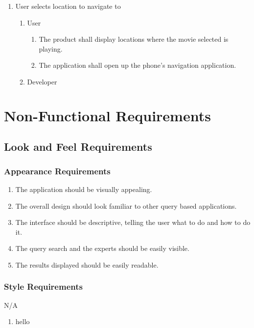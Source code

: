 \documentclass[]{article}
\begin{document}
\begin{enumerate}[{BE}1.]
	\item User selects location to navigate to
	\begin{enumerate}[{VP3}.1]
		\item User
			\begin{enumerate}
				\item The product shall display locations where the movie selected is playing.
				\item The application shall open up the phone’s navigation application.
			\end{enumerate}
		\item Developer
	\end{enumerate}
\end{enumerate}



\section{Non-Functional Requirements} \label{nfreq}
\label{sec:non-functional_requirements}
\subsection{Look and Feel Requirements}
\label{sub:look_and_feel_requirements}


\subsubsection{Appearance Requirements}
\label{ssub:appearance_requirements}
\begin{enumerate}[{LF}1. ]
	\item The application should be visually appealing.
	\item The overall design should look familiar to other query based applications.
	\item The interface should be descriptive, telling the user what to do and how to do it.
	\item The query search and the experts should be easily visible.
	\item The results displayed should be easily readable.
	\setcounter{placeholder}{\theenumi}
\end{enumerate}

\subsubsection{Style Requirements}
\label{ssub:style_requirements}
N/A
\begin{enumerate}
	\item hello
\end{enumerate}
\end{document}
